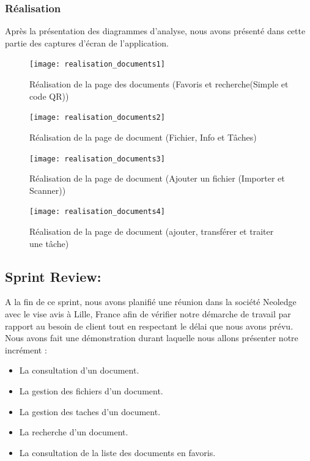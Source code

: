 \subsubsection{Réalisation}

Après la présentation des diagrammes d'analyse, nous avons présenté dans cette partie des captures d'écran de l'application.

\begin{figure}[H]
  \centering
  \texttt{[image: realisation\_documents1]}
  \caption{Réalisation de la page des documents (Favoris et recherche(Simple et code QR))}
  \label{fig:realisation_documents1}
\end{figure}

\begin{figure}[H]
  \centering
  \texttt{[image: realisation\_documents2]}
  \caption{Réalisation de la page de document (Fichier, Info et Tâches)}
  \label{fig:realisation_documents2}
\end{figure}

\begin{figure}[H]
  \centering
  \texttt{[image: realisation\_documents3]}
  \caption{Réalisation de la page de document (Ajouter un fichier (Importer et Scanner))}
  \label{fig:realisation_documents3}
\end{figure}

\begin{figure}[H]
  \centering
  \texttt{[image: realisation\_documents4]}
  \caption{Réalisation de la page de document (ajouter, transférer et traiter une tâche)}
  \label{fig:realisation_documents4}
\end{figure}



\subsection{Sprint Review:}
A la fin de ce sprint, nous avons planifié une réunion dans la société Neoledge avec le vise avis à Lille, France afin de vérifier notre démarche de travail par rapport au besoin de client tout en respectant le délai que nous avons prévu.
Nous avons fait une démonstration durant laquelle nous allons présenter notre incrément :
\begin{itemize}
  \item La consultation d'un document.
  \item La gestion des fichiers d'un document.
  \item La gestion des taches d'un document.
  \item La recherche d'un document.
  \item La consultation de la liste des documents en favoris.
\end{itemize}

